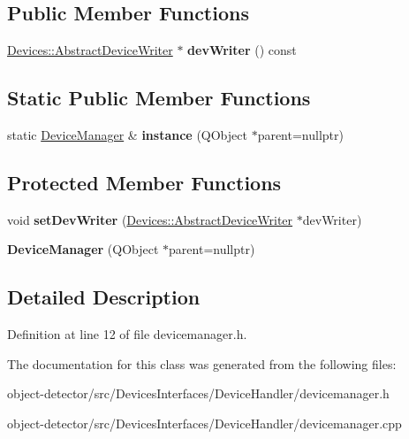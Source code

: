 \subsection*{Public Member Functions}
\begin{DoxyCompactItemize}
\item 
\mbox{\label{class_devices_1_1_device_manager_a3d3d30f8dae34a982aa1f5cce1ed49f5}} 
\hyperlink{class_devices_1_1_abstract_device_writer}{Devices\+::\+Abstract\+Device\+Writer} $\ast$ {\bfseries dev\+Writer} () const
\end{DoxyCompactItemize}
\subsection*{Static Public Member Functions}
\begin{DoxyCompactItemize}
\item 
\mbox{\label{class_devices_1_1_device_manager_ae8d81387e08e66e0f3c1d1d60aa8357f}} 
static \hyperlink{class_devices_1_1_device_manager}{Device\+Manager} \& {\bfseries instance} (Q\+Object $\ast$parent=nullptr)
\end{DoxyCompactItemize}
\subsection*{Protected Member Functions}
\begin{DoxyCompactItemize}
\item 
\mbox{\label{class_devices_1_1_device_manager_a546ce7493ea49bbadf782fa338fd24c4}} 
void {\bfseries set\+Dev\+Writer} (\hyperlink{class_devices_1_1_abstract_device_writer}{Devices\+::\+Abstract\+Device\+Writer} $\ast$dev\+Writer)
\item 
\mbox{\label{class_devices_1_1_device_manager_ae71ec0ba8dac9215cf6c79fb1800e006}} 
{\bfseries Device\+Manager} (Q\+Object $\ast$parent=nullptr)
\end{DoxyCompactItemize}


\subsection{Detailed Description}


Definition at line 12 of file devicemanager.\+h.



The documentation for this class was generated from the following files\+:\begin{DoxyCompactItemize}
\item 
object-\/detector/src/\+Devices\+Interfaces/\+Device\+Handler/devicemanager.\+h\item 
object-\/detector/src/\+Devices\+Interfaces/\+Device\+Handler/devicemanager.\+cpp\end{DoxyCompactItemize}
